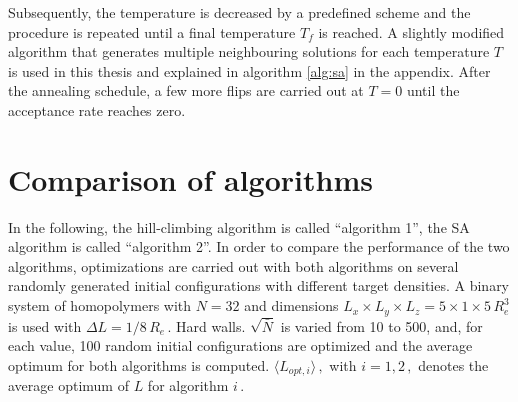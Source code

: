 \documentclass[bachelor,       %
               twoside,        %
               BCOR10mm,       %
               ngerman, english %
               ]{GAUBM}
\begin{document}
Subsequently, the temperature is decreased by a predefined scheme and the procedure is repeated until a final temperature $T_f$ is reached. A slightly modified algorithm that generates multiple neighbouring solutions for each temperature $T$ is used in this thesis and explained in algorithm \ref{alg:sa} in the appendix. After the annealing schedule, a few more flips are carried out at $T=0$ until the acceptance rate reaches zero. 

\section{Comparison of algorithms}

In the following, the hill-climbing algorithm is called \enquote{algorithm 1}, the SA algorithm is called \enquote{algorithm 2}. In order to compare the performance of the two algorithms, optimizations are carried out with both algorithms on several randomly generated initial configurations with different target densities. A binary system of homopolymers with $N=32$ and dimensions $L_x\times L_y\times L_z=5\times1\times5\,R_e^3$ is used with $\Delta L=1/8\,R_e\,.$ Hard walls. $\sqrt{\bar N}$ is varied from 10 to 500, and, for each value, 100 random initial configurations are optimized and the average optimum for both algorithms is computed. $\langle  L_{opt,i}\rangle\,,$ with $i=1,2\,,$  denotes the average optimum of $L$ for algorithm $i\,.$
\end{document}
